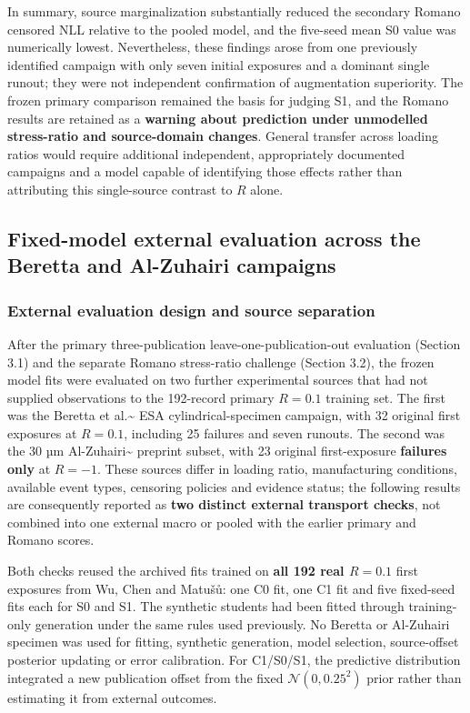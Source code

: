 \documentclass[12pt,a4paper]{article}
\begin{document}
In summary, source marginalization substantially reduced the secondary Romano censored NLL relative to the pooled model, and the five-seed mean S0 value was numerically lowest. Nevertheless, these findings arose from one previously identified campaign with only seven initial exposures and a dominant single runout; they were not independent confirmation of augmentation superiority. The frozen primary comparison remained the basis for judging S1, and the Romano results are retained as a \textbf{warning about prediction under unmodelled stress-ratio and source-domain changes}. General transfer across loading ratios would require additional independent, appropriately documented campaigns and a model capable of identifying those effects rather than attributing this single-source contrast to \(R\) alone.

\subsection{Fixed-model external evaluation across the Beretta and Al-Zuhairi campaigns}

\subsubsection{External evaluation design and source separation}

After the primary three-publication leave-one-publication-out evaluation (Section 3.1) and the separate Romano stress-ratio challenge (Section 3.2), the frozen model fits were evaluated on two further experimental sources that had not supplied observations to the 192-record primary \(R=0.1\) training set. The first was the Beretta et al.\textasciitilde{}\cite{beretta2022} ESA cylindrical-specimen campaign, with 32 original first exposures at \(R=0.1\), including 25 failures and seven runouts. The second was the 30 µm Al-Zuhairi\textasciitilde{}\cite{alzuhairi2026} preprint subset, with 23 original first-exposure \textbf{failures only} at \(R=-1\). These sources differ in loading ratio, manufacturing conditions, available event types, censoring policies and evidence status; the following results are consequently reported as \textbf{two distinct external transport checks}, not combined into one external macro or pooled with the earlier primary and Romano scores.

Both checks reused the archived fits trained on \textbf{all 192 real \(R=0.1\)} first exposures from Wu, Chen and Matušů: one C0 fit, one C1 fit and five fixed-seed fits each for S0 and S1. The synthetic students had been fitted through training-only generation under the same rules used previously. No Beretta or Al-Zuhairi specimen was used for fitting, synthetic generation, model selection, source-offset posterior updating or error calibration. For C1/S0/S1, the predictive distribution integrated a new publication offset from the fixed \(\mathcal N(0,0.25^2)\) prior rather than estimating it from external outcomes.
\end{document}
